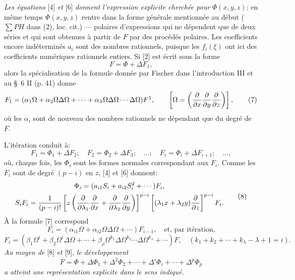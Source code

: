 \emph{Les équations} [4] \emph{et} [6] \emph{donnent l'expression explicite cherchée pour} $\Phi(x,y,z)$; en même temps $\Phi(x,y,z)$ rentre dans la forme générale mentionnée au début ($\sum PH$ dans (2), loc. cit.) --- polaires d'expressions qui ne dépendent que de deux séries et qui sont obtenues à partir de $F$ par des procédés polaires. Les coefficients encore indéterminés $a_i$ sont des nombres rationnels, puisque les $f_i(\xi)$ ont ici des coefficients numériques rationnels entiers. Si [2] est écrit sous la forme
\begin{equation}
        F=\Phi+\Delta F_1,
\tag{2a}
\end{equation}
alors la spécialisation de la formule donnée par Fischer dans l'introduction III et au \S~6 II (p. 41) donne
\begin{equation}
        F_1=(\alpha_1\Omega+\alpha_2\Omega\Delta\Omega+\cdots+\alpha_\lambda\Omega\Delta\Omega\cdots\Delta\Omega)F\footnotemark,
        \qquad \left[\Omega=\left(\frac{\p}{\p x}\frac{\p}{\p y}\frac{\p}{\p z}\right)\right],
\tag{7}
\end{equation}
où les $\alpha_i$ sont de nouveau des nombres rationnels ne dépendant que du degré de $F$.

L'itération conduit à:
\[
        F_1=\Phi_1+\Delta F_2;\quad F_2=\Phi_2+\Delta F_3;\quad\ldots;\quad
        F_i=\Phi_i+\Delta F_{i+1};\quad\ldots,
\]
où, chaque fois, les $\Phi_i$ sont les formes normales correspondant aux $F_i$. Comme les $F_i$ sont de degré $(p-i)$ en $z$, [4] et [6] donnent:
\begin{equation}
\begin{gathered}
        \Phi_i=(a_{i1}S_i+a_{i2}S_i^2+\cdots)F_i,\\
        S_iF_i=\frac1{(p-i)!}
        \left[z\left(\frac{\partial}{\partial\lambda_1}\frac{\partial}{\partial x}+
        \frac{\partial}{\partial\lambda_2}\frac{\partial}{\partial y}\right)\right]^{p-i}
        \left[(\lambda_1x+\lambda_2y)\frac{\partial}{\partial z}\right]^{p-i}F_i.
\end{gathered}
\tag{8}
\end{equation}
À la formule [7] correspond
\[
        F_i=(\alpha_{i1}\Omega+\alpha_{i2}\Omega\Delta\Omega+\cdots)F_{i-1},
        \quad\text{et, par itération,}
\]
\begin{equation}
        F_i=(\beta_1\Omega^i+\beta_2\Omega^i\Delta\Omega+\cdots
        +\beta_\rho\Omega^{k_1}\Delta\Omega^{k_2}\cdots\Delta\Omega^{k_\lambda}+\cdots)F,
        \quad(k_1+k_2+\cdots+k_\lambda-\lambda+1=i).
\tag{9}
\end{equation}
\emph{Au moyen de} [8] \emph{et} [9], \emph{le développement}
\[
        F=\Phi+\Delta\Phi_1+\Delta^2\Phi_2+\cdots+\Delta^i\Phi_i+\cdots+\Delta^p\Phi_p
\]
\emph{a atteint une représentation explicite dans le sens indiqué.}

